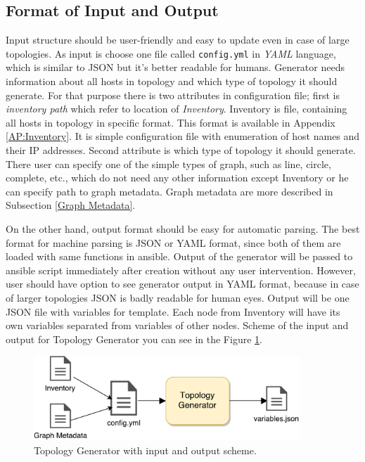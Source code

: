 \subsection{Format of Input and Output}
Input structure should be user-friendly and easy to update even in case of large topologies. As input is choose one file called \texttt{config.yml} in \emph{YAML}\footnotemark{}  language, which is similar to JSON but it's better readable for humans. Generator needs information about all hosts in topology and which type of topology it should generate. For that purpose there is two attributes in configuration file; first is \emph{inventory path} which refer to location of \emph{Inventory}. Inventory is file, containing all hosts in topology in specific format. This format is available in Appendix \ref{AP:Inventory}. It is simple configuration file with enumeration of host names and their IP addresses. Second attribute is which type of topology it should generate. There user can specify one of the simple types of graph, such as line, circle, complete, etc., which do not need any other information except Inventory or he can specify path to graph metadata. Graph metadata are more described in Subsection \ref{Graph Metadata}.

On the other hand, output format should be easy for automatic parsing. The best format for machine parsing is JSON or YAML format, since both of them are loaded with same functions in ansible. Output of the generator will be passed to ansible script immediately after creation without any user intervention. However, user should have option to see generator output in YAML format, because in case of larger topologies JSON is badly readable for human eyes. Output will be one JSON file with variables for template. Each node from Inventory will have its own variables separated from variables of other nodes. Scheme of the input and output for Topology Generator you can see in the Figure \ref{fig:generator}.

\begin{figure}[H]
  \centering
  \includegraphics[width=10cm]{obrazky-figures/generator.pdf}
  \caption{Topology Generator with input and output scheme.}
  \label{fig:generator}
\end{figure}

